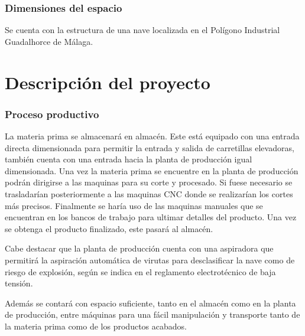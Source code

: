 \documentclass[../main.tex]{subfiles}
\begin{document}
\subsubsection{Dimensiones del espacio}
Se cuenta con la estructura de una nave localizada en el Polígono Industrial Guadalhorce de Málaga. 

\section{Descripción del proyecto}
\subsubsection{Proceso productivo}
La materia prima se almacenará en almacén. Este está equipado con una entrada directa dimensionada para permitir la entrada y salida de carretillas elevadoras, también cuenta con una entrada hacia la planta de producción igual dimensionada. Una vez la materia prima se encuentre en la planta de producción podrán dirigirse a las maquinas para su corte y procesado. Si fuese necesario se trasladarían posteriormente a las maquinas CNC donde se realizarían los cortes más precisos. Finalmente se haría uso de las maquinas manuales que se encuentran en los bancos de trabajo para ultimar detalles del producto. Una vez se obtenga el producto finalizado, este pasará al almacén. \par
\vspace{0.5 cm}
Cabe destacar que la planta de producción cuenta con una aspiradora que permitirá la aspiración automática de virutas para desclasificar la nave como de riesgo de explosión, según se indica en el reglamento electrotécnico de baja tensión. \par
\vspace{0.5 cm}
Además se contará con espacio suficiente, tanto en el almacén como en la planta de producción, entre máquinas para una fácil manipulación y transporte tanto de la materia prima como de los productos acabados. 
\end{document}
